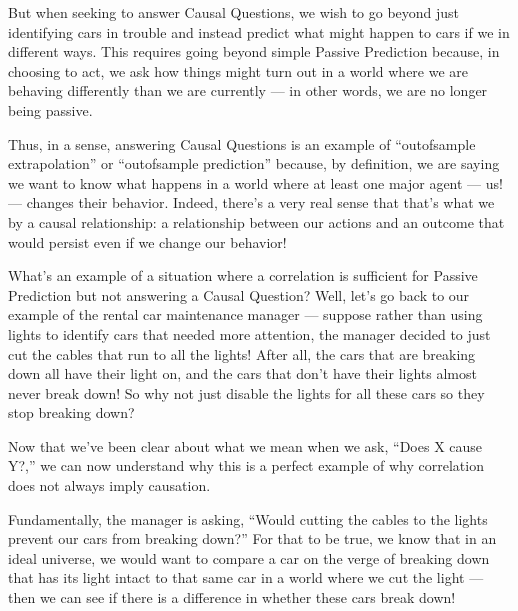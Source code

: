 \documentclass[letterpaper,10pt,english]{jupyterBook}
\begin{document}
\sphinxAtStartPar
But when seeking to answer Causal Questions, we wish to go beyond just identifying cars in trouble and instead predict what might happen to cars if we  in different ways. This requires going beyond simple Passive Prediction because, in choosing to act, we ask how things might turn out in a world where we are behaving differently than we are currently — in other words, we are no longer being passive.

\sphinxAtStartPar
Thus, in a sense, answering Causal Questions is  an example of “out\sphinxhyphen{}of\sphinxhyphen{}sample extrapolation” or “out\sphinxhyphen{}of\sphinxhyphen{}sample prediction” because, by definition, we are saying we want to know what happens in a world where at least one major agent — us! — changes their behavior. Indeed, there’s a very real sense that that’s what we  by a causal relationship: a relationship between our actions and an outcome that would persist even if we change our behavior!

\sphinxAtStartPar
What’s an example of a situation where a correlation is sufficient for Passive Prediction but not answering a Causal Question? Well, let’s go back to our example of the rental car maintenance manager — suppose rather than using  lights to identify cars that needed more attention, the manager decided to just cut the cables that run to all the  lights! After all, the cars that are breaking down all have their  light on, and the cars that don’t have their  lights almost never break down! So why not just disable the  lights for all these cars so they stop breaking down?

\sphinxAtStartPar
Now that we’ve been clear about what we mean when we ask, “Does X cause Y?,” we can now understand why this is a perfect example of why correlation does not always imply causation.

\sphinxAtStartPar
Fundamentally, the manager is asking, “Would cutting the cables to the  lights prevent our cars from breaking down?” For that to be true, we know that in an ideal universe, we would want to compare a car on the verge of breaking down that has its  light intact to that same car in a world where we cut the  light — then we can see if there is a difference in whether these cars break down!
\end{document}
